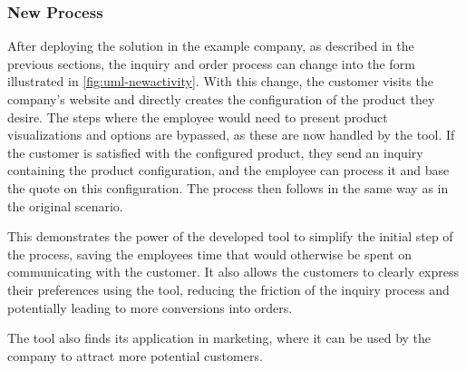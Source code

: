 \subsubsection{New Process}

After deploying the solution in the example company, as described in the previous sections, the inquiry and order process can change into the form illustrated in \autoref{fig:uml-newactivity}. With this change, the customer visits the company's website and directly creates the configuration of the product they desire. The steps where the employee would need to present product visualizations and options are bypassed, as these are now handled by the tool. If the customer is satisfied with the configured product, they send an inquiry containing the product configuration, and the employee can process it and base the quote on this configuration. The process then follows in the same way as in the original scenario.

This demonstrates the power of the developed tool to simplify the initial step of the process, saving the employees time that would otherwise be spent on communicating with the customer. It also allows the customers to clearly express their preferences using the tool, reducing the friction of the inquiry process and potentially leading to more conversions into orders.

The tool also finds its application in marketing, where it can be used by the company to attract more potential customers.
